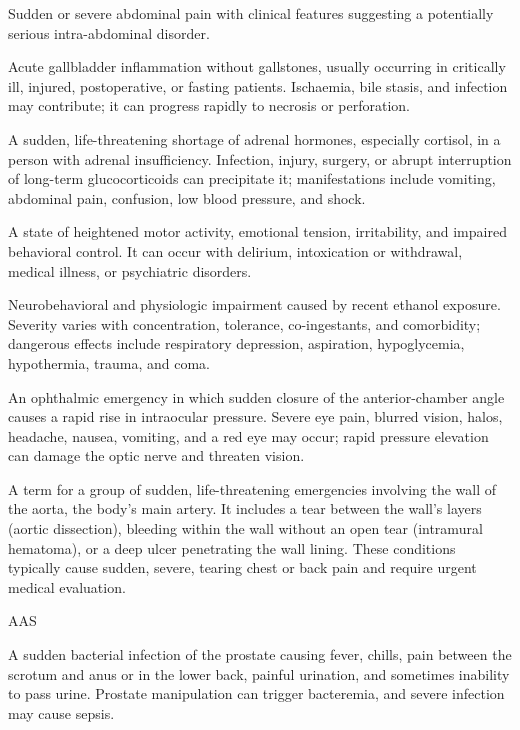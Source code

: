  Sudden or severe abdominal pain with clinical features suggesting a potentially serious intra-abdominal disorder.

 Acute gallbladder inflammation without gallstones, usually occurring in critically ill, injured, postoperative, or fasting patients. Ischaemia, bile stasis, and infection may contribute; it can progress rapidly to necrosis or perforation.

 A sudden, life-threatening shortage of adrenal hormones, especially cortisol, in a person with adrenal insufficiency. Infection, injury, surgery, or abrupt interruption of long-term glucocorticoids can precipitate it; manifestations include vomiting, abdominal pain, confusion, low blood pressure, and shock.

 A state of heightened motor activity, emotional tension,
irritability, and impaired behavioral control. It can occur with delirium,
intoxication or withdrawal, medical illness, or psychiatric disorders.

 Neurobehavioral and physiologic impairment caused by recent ethanol exposure. Severity
varies with concentration, tolerance, co-ingestants, and comorbidity; dangerous effects
include respiratory depression, aspiration, hypoglycemia, hypothermia, trauma, and coma.

 An ophthalmic emergency in which sudden closure of the anterior-chamber angle causes a rapid
rise in intraocular pressure. Severe eye pain, blurred vision, halos, headache, nausea,
vomiting, and a red eye may occur; rapid pressure elevation can damage the optic nerve
and threaten vision.

 A term for a group of sudden, life-threatening emergencies involving the wall of the aorta, the body's main artery. It includes a tear between the wall's layers (aortic dissection), bleeding within the wall without an open tear (intramural hematoma), or a deep ulcer penetrating the wall lining. These conditions typically cause sudden, severe, tearing chest or back pain and require urgent medical evaluation.

\synonyms
AAS

 A sudden bacterial infection of the prostate causing fever, chills, pain between the scrotum and anus or in the lower back, painful urination, and sometimes inability to pass urine. Prostate manipulation can trigger bacteremia, and severe infection may cause sepsis.

